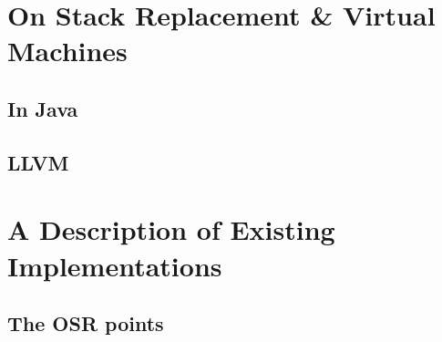 \section{On Stack Replacement \& Virtual Machines}
\subsection{In Java}

\subsection{LLVM}

\section{A Description of Existing Implementations}
\subsection{The OSR points}
